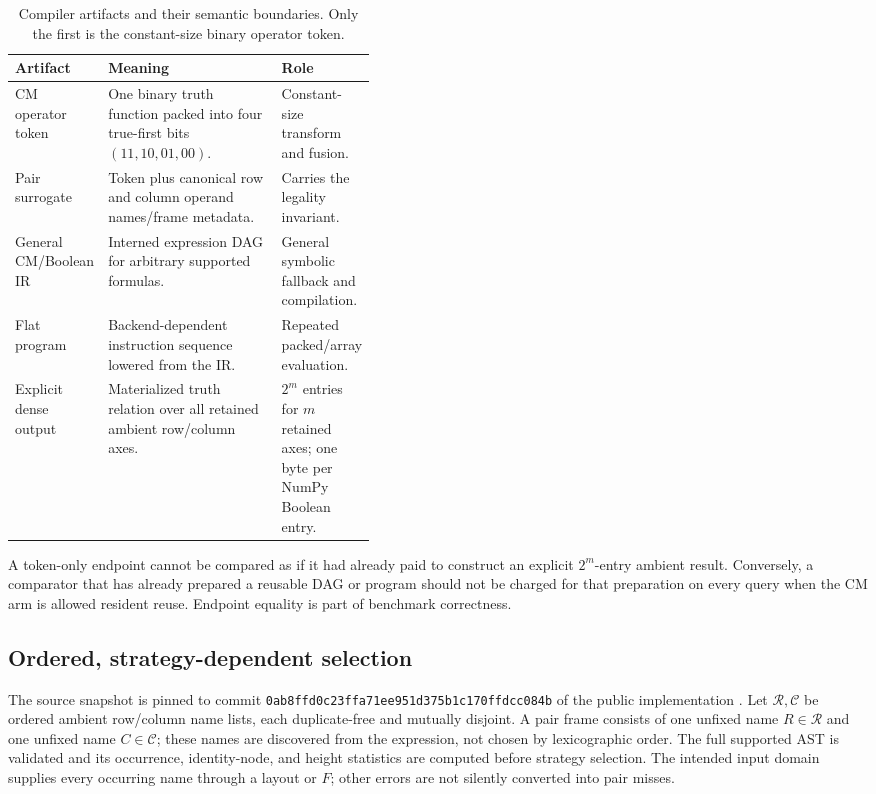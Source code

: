 \documentclass[10pt]{article}
\theoremstyle{plain}
\theoremstyle{definition}
\theoremstyle{remark}
\begin{document}
\begin{table}[t]
\centering
\small
\begin{tabularx}{\linewidth}{@{}>{\raggedright\arraybackslash}p{0.18\linewidth}>{\raggedright\arraybackslash}X >{\raggedright\arraybackslash}p{0.24\linewidth}@{}}
\toprule
\textbf{Artifact} & \textbf{Meaning} & \textbf{Role}\\
\midrule
CM operator token & One binary truth function packed into four true-first bits $(11,10,01,00)$. & Constant-size transform and fusion.\\
Pair surrogate & Token plus canonical row and column operand names/frame metadata. & Carries the legality invariant.\\
General CM/Boolean IR & Interned expression DAG for arbitrary supported formulas. & General symbolic fallback and compilation.\\
Flat program & Backend-dependent instruction sequence lowered from the IR. & Repeated packed/array evaluation.\\
Explicit dense output & Materialized truth relation over all retained ambient row/column axes. & $2^m$ entries for $m$ retained axes; one byte per NumPy Boolean entry.\\
\bottomrule
\end{tabularx}
\caption{Compiler artifacts and their semantic boundaries. Only the first is the constant-size binary operator token.}
\label{tab:artifacts}
\end{table}

A token-only endpoint cannot be compared as if it had already paid to construct an explicit $2^m$-entry ambient result. Conversely, a comparator that has already prepared a reusable DAG or program should not be charged for that preparation on every query when the CM arm is allowed resident reuse. Endpoint equality is part of benchmark correctness.

\subsection{Ordered, strategy-dependent selection}
\label{sec:selection}

The source snapshot is pinned to commit \texttt{0ab8ffd0c23ffa71ee951d375b1c170ffdcc084b} of the public implementation \cite{CompilerSnapshot2026}. Let $\mathcal R,\mathcal C$ be ordered ambient row/column name lists, each duplicate-free and mutually disjoint. A pair frame consists of one unfixed name $R\in\mathcal R$ and one unfixed name $C\in\mathcal C$; these names are discovered from the expression, not chosen by lexicographic order. The full supported AST is validated and its occurrence, identity-node, and height statistics are computed before strategy selection. The intended input domain supplies every occurring name through a layout or $F$; other errors are not silently converted into pair misses.
\end{document}
